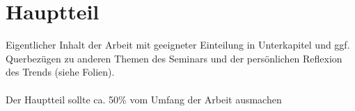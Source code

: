 \section{Hauptteil}
Eigentlicher Inhalt der Arbeit mit geeigneter Einteilung in Unterkapitel und ggf. Querbezügen zu anderen Themen des Seminars und der persönlichen Reflexion des Trends (siehe Folien). \\ \\
Der Hauptteil sollte ca. 50\% vom Umfang der Arbeit ausmachen